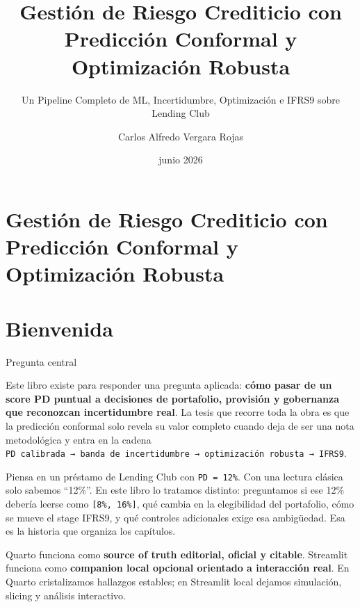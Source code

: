 \documentclass[
  spanish,
  11pt,
  letterpaper,
]{scrbook}
\title{Gestión de Riesgo Crediticio con Predicción Conformal y
Optimización Robusta}
\subtitle{Un Pipeline Completo de ML, Incertidumbre, Optimización e
IFRS9 sobre Lending Club}
\author{Carlos Alfredo Vergara Rojas}
\date{junio 2026}
\renewcommand*\contentsname{Tabla de contenidos}
\newcommand\contentsname{Tabla de contenidos}
\theoremstyle{plain}
\theoremstyle{remark}
\begin{document}
\frontmatter
\maketitle

\renewcommand*\contentsname{Tabla de contenidos}
{
\setcounter{tocdepth}{1}
\tableofcontents
}
\listoffigures
\listoftables

\mainmatter
{}

\chapter{Gestión de Riesgo Crediticio con Predicción Conformal y
Optimización
Robusta}\label{gestiuxf3n-de-riesgo-crediticio-con-predicciuxf3n-conformal-y-optimizaciuxf3n-robusta}


\chapter*{Bienvenida}\label{bienvenida}


{Pregunta central}

Este libro existe para responder una pregunta aplicada: \textbf{cómo
pasar de un score PD puntual a decisiones de portafolio, provisión y
gobernanza que reconozcan incertidumbre real}. La tesis que recorre toda
la obra es que la predicción conformal solo revela su valor completo
cuando deja de ser una nota metodológica y entra en la cadena
\texttt{PD\ calibrada\ →\ banda\ de\ incertidumbre\ →\ optimización\ robusta\ →\ IFRS9}.

Piensa en un préstamo de Lending Club con \texttt{PD\ =\ 12\%}. Con una
lectura clásica solo sabemos ``12\%''. En este libro lo tratamos
distinto: preguntamos si ese 12\% debería leerse como
\texttt{{[}8\%,\ 16\%{]}}, qué cambia en la elegibilidad del portafolio,
cómo se mueve el stage IFRS9, y qué controles adicionales exige esa
ambigüedad. Esa es la historia que organiza los capítulos.

\begin{tcolorbox}[enhanced jigsaw, arc=.35mm, bottomrule=.15mm, bottomtitle=1mm, breakable, colback=white, colbacktitle=quarto-callout-note-color!10!white, colframe=quarto-callout-note-color-frame, coltitle=black, left=2mm, leftrule=.75mm, opacityback=0, opacitybacktitle=0.6, rightrule=.15mm, title=\textcolor{quarto-callout-note-color}{\faInfo}\hspace{0.5em}{Dos superficies, una misma fuente de verdad}, titlerule=0mm, toprule=.15mm, toptitle=1mm]

Quarto funciona como \textbf{source of truth editorial, oficial y
citable}. Streamlit funciona como \textbf{companion local opcional
orientado a interacción real}. En Quarto cristalizamos hallazgos
estables; en Streamlit local dejamos simulación, slicing y análisis
interactivo.

\end{tcolorbox}
\end{document}
